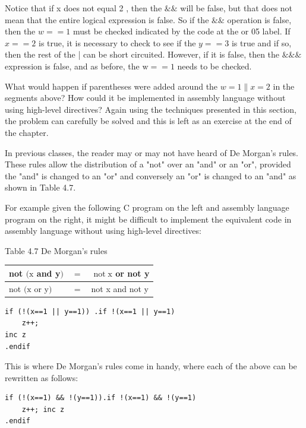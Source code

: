 \documentclass[10pt]{book}
\begin{document}
Notice that if x does not equal 2 , then the $\& \&$ will be false, but that does not mean that the entire logical expression is false. So if the $\& \&$ operation is false, then the $w==1$ must be checked indicated by the code at the or 05 label. If $x==2$ is true, it is necessary to check to see if the $y==3$ is true and if so, then the rest of the | can be short circuited. However, if it is false, then the $\& \& \&$ expression is false, and as before, the $\mathrm{w}==1$ needs to be checked.

What would happen if parentheses were added around the $w=1 \| x=2$ in the segments above? How could it be implemented in assembly language without using high-level directives? Again using the techniques presented in this section, the problem can carefully be solved and this is left as an exercise at the end of the chapter.

In previous classes, the reader may or may not have heard of De Morgan's rules. These rules allow the distribution of a "not" over an "and" or an "or", provided the "and" is changed to an "or" and conversely an "or" is changed to an "and" as shown in Table 4.7.

For example given the following C program on the left and assembly language program on the right, it might be difficult to implement the equivalent code in assembly language without using high-level directives:

Table 4.7 De Morgan's rules


\begin{center}
\begin{tabular}{l|l|l|}
\hline
not $(\mathrm{x}$ and y$)$ & $=$ & $\operatorname{not} \mathrm{x}$ or not y \\
\hline
not $(\mathrm{x}$ or y$)$ & $=$ & not x and not y \\
\hline
\end{tabular}
\end{center}

\begin{verbatim}
if (!(x==1 || y==1)) .if !(x==1 || y==1)
    z++;
inc z
.endif
\end{verbatim}

This is where De Morgan's rules come in handy, where each of the above can be rewritten as follows:

\begin{verbatim}
if (!(x==1) && !(y==1)).if !(x==1) && !(y==1)
    z++; inc z
.endif
\end{verbatim}
\end{document}
